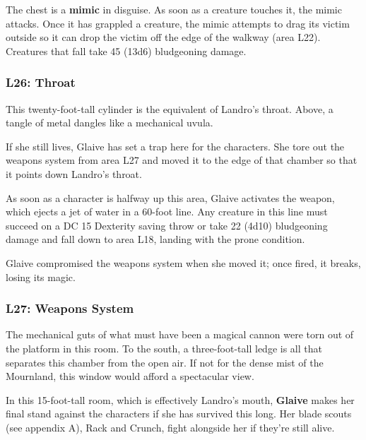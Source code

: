 \documentclass[10pt,a4paper,twoside,bg=print,twocolumn,openany,nodeprecatedcode]{dndbook}
\begin{document}
The chest is a \textbf{mimic} in disguise. As soon as a creature touches it, the mimic attacks. Once it has grappled a creature, the mimic attempts to drag its victim outside so it can drop the victim off the edge of the walkway (area L22). Creatures that fall take 45 (13d6) bludgeoning damage.

\subsubsection{L26: Throat}
\begin{DndReadAloud}{}
This twenty-foot-tall cylinder is the equivalent of Landro's throat. Above, a tangle of metal dangles like a mechanical uvula.

\end{DndReadAloud}

If she still lives, Glaive has set a trap here for the characters. She tore out the weapons system from area L27 and moved it to the edge of that chamber so that it points down Landro's throat.

As soon as a character is halfway up this area, Glaive activates the weapon, which ejects a jet of water in a 60-foot line. Any creature in this line must succeed on a DC 15 Dexterity saving throw or take 22 (4d10) bludgeoning damage and fall down to area L18, landing with the prone condition.

Glaive compromised the weapons system when she moved it; once fired, it breaks, losing its magic.

\subsubsection{L27: Weapons System}
\begin{DndReadAloud}{}
The mechanical guts of what must have been a magical cannon were torn out of the platform in this room. To the south, a three-foot-tall ledge is all that separates this chamber from the open air. If not for the dense mist of the Mournland, this window would afford a spectacular view.

\end{DndReadAloud}

In this 15-foot-tall room, which is effectively Landro's mouth, \textbf{Glaive} makes her final stand against the characters if she has survived this long. Her blade scouts (see appendix A), Rack and Crunch, fight alongside her if they're still alive.
\end{document}
